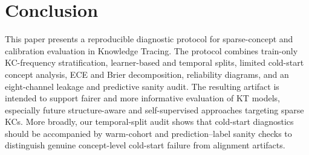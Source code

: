 \section{Conclusion}
\label{sec:conclusion}
This paper presents a reproducible diagnostic protocol for sparse-concept and calibration evaluation in Knowledge Tracing. The protocol combines train-only KC-frequency stratification, learner-based and temporal splits, limited cold-start concept analysis, ECE and Brier decomposition, reliability diagrams, and an eight-channel leakage and predictive sanity audit. The resulting artifact is intended to support fairer and more informative evaluation of KT models, especially future structure-aware and self-supervised approaches targeting sparse KCs. More broadly, our temporal-split audit shows that cold-start diagnostics should be accompanied by warm-cohort and prediction--label sanity checks to distinguish genuine concept-level cold-start failure from alignment artifacts.
